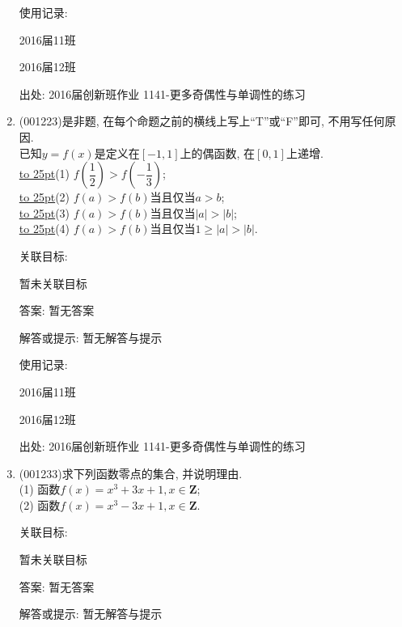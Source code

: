 \documentclass[10pt,a4paper]{article}
\newcommand{\blank}[1]{\underline{\hbox to #1pt{}}}
\begin{document}
\begin{enumerate}[1.]
使用记录:

2016届11班					

2016届12班					


出处: 2016届创新班作业	1141-更多奇偶性与单调性的练习
\item { (001223)}是非题, 在每个命题之前的横线上写上``T''或``F''即可, 不用写任何原因.\\ 
已知$y=f(x)$是定义在$[-1,1]$上的偶函数, 在$[0,1]$上递增.\\ 
\blank{25}(1) $f(\dfrac{1}{2})>f(-\dfrac{1}{3})$;\\ 
\blank{25}(2) $f(a)>f(b)$当且仅当$a>b$;\\ 
\blank{25}(3) $f(a)>f(b)$当且仅当$|a|>|b|$;\\ 
\blank{25}(4) $f(a)>f(b)$当且仅当$1\ge |a|>|b|$.


关联目标:

暂未关联目标

答案: 暂无答案

解答或提示: 暂无解答与提示

使用记录:

2016届11班				

2016届12班				


出处: 2016届创新班作业	1141-更多奇偶性与单调性的练习
\item { (001233)}求下列函数零点的集合, 并说明理由.\\ 
(1) 函数$f(x)=x^3+3x+1,x\in\mathbf{Z}$;\\ 
(2) 函数$f(x)=x^3-3x+1,x\in\mathbf{Z}$.


关联目标:

暂未关联目标

答案: 暂无答案

解答或提示: 暂无解答与提示


\end{enumerate}
\end{document}
